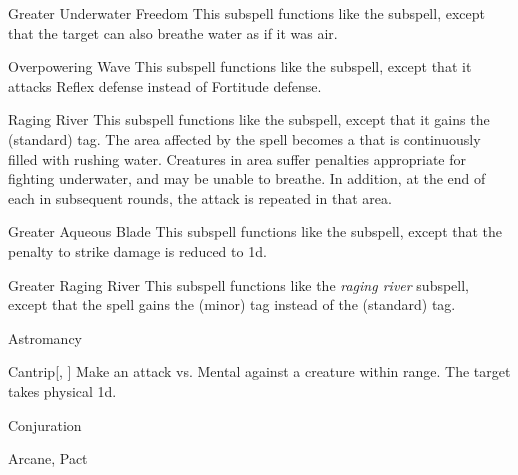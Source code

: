 \begin{ability}[\nth{3}]{Greater Underwater Freedom}
This subspell functions like the  subspell, except that the target can also breathe water as if it was air.
\end{ability}
\vspace{0.25em}


\begin{ability}[\nth{3}]{Overpowering Wave}
This subspell functions like the  subspell, except that it attacks Reflex defense instead of Fortitude defense.
\end{ability}
\vspace{0.25em}


\begin{ability}[\nth{3}]{Raging River}
This subspell functions like the  subspell, except that it gains the  (standard) tag.
The area affected by the spell becomes a  that is continuously filled with rushing water.
Creatures in area suffer penalties appropriate for fighting underwater, and may be unable to breathe.
In addition, at the end of each  in subsequent rounds, the attack is repeated in that area.
\end{ability}
\vspace{0.25em}


\begin{ability}[\nth{5}]{Greater Aqueous Blade}
This subspell functions like the  subspell, except that the penalty to strike damage is reduced to \minus1d.
\end{ability}
\vspace{0.25em}


\begin{ability}[\nth{6}]{Greater Raging River}
This subspell functions like the \textit{raging river} subspell, except that the spell gains the  (minor) tag instead of the  (standard) tag.
\end{ability}
\vspace{0.25em}

\newpage
\begin{spellsection}{Astromancy}

\begin{spellheader}
\end{spellheader}


\begin{ability}{Cantrip}[, ]
Make an attack vs. Mental against a creature within \rngmed range.
\hit The target takes physical  \minus1d.
\end{ability}




 Conjuration

 Arcane, Pact
\end{spellsection}


